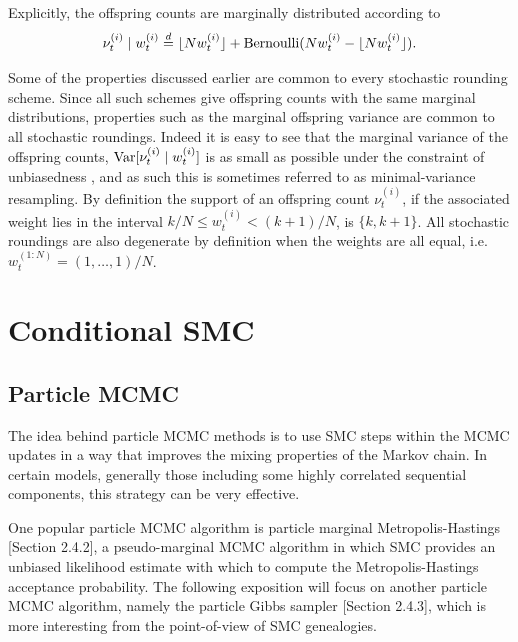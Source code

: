 Explicitly, the offspring counts are marginally distributed according to 
\begin{equation*}
\nu_t^{(i)} \mid w_t^{(i)}
\overset{d}{=} \lfloor N w_t^{(i)} \rfloor + \operatorname{Bernoulli}( Nw_t^{(i)} - \lfloor N w_t^{(i)} \rfloor ) .
\end{equation*}

Some of the properties discussed earlier are common to every stochastic rounding scheme. 
Since all such schemes give offspring counts with the same marginal distributions, properties such as the marginal offspring variance are common to all stochastic roundings. Indeed it is easy to see that the marginal variance of the offspring counts, $\operatorname{Var}[ \nu_t^{(i)} \mid w_t^{(i)} ]$ is as small as possible under the constraint of unbiasedness , and as such this is sometimes referred to as minimal-variance resampling.
By definition the support of an offspring count $\nu_t^{(i)}$, if the associated weight lies in the interval $k/N \leq w_t^{(i)} < (k+1)/N$, is $\{ k, k+1\}$. 
All stochastic roundings are also degenerate by definition when the weights are all equal, i.e.\ $w_t^{(1:N)} = (1,\dots, 1)/N$.





\section{Conditional SMC \seb{$\sim$} }

\subsection{Particle MCMC \seb{$\checkmark$} }

The idea behind particle MCMC methods is to use SMC steps within the MCMC updates in a way that improves the mixing properties of the Markov chain.
In certain models, generally those including some highly correlated sequential components, this strategy can be very effective.

One popular particle MCMC algorithm is particle marginal Metropolis-Hastings \parencite{andrieu2010}[Section 2.4.2], a pseudo-marginal MCMC algorithm in which SMC provides an unbiased likelihood estimate with which to compute the Metropolis-Hastings acceptance probability.
The following exposition will focus on another particle MCMC algorithm, namely the particle Gibbs sampler \parencite{andrieu2010}[Section 2.4.3], which is more interesting from the point-of-view of SMC genealogies.

